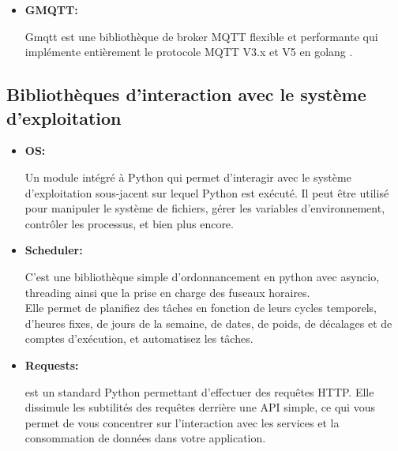 \begin{itemize}
\begin{figure}[!htb]
\begin{minipage}{0.60\textwidth}
                \end{minipage}
            \end{figure}
    \item \textbf{GMQTT: }
       
        \par Gmqtt est une bibliothèque de broker MQTT flexible et performante qui implémente entièrement le protocole MQTT V3.x et V5 en golang \cite{gmqtt}. 
       
   \end{itemize}
\subsection{Bibliothèques d'interaction avec le système d'exploitation}
\begin{itemize}
    \item \textbf{OS: }
        \par Un module intégré à Python qui permet d'interagir avec le système d'exploitation sous-jacent sur lequel Python est exécuté. 
        Il peut être utilisé pour manipuler le système de fichiers, gérer les variables d'environnement, contrôler les processus, et bien plus encore\cite{os}.

    \item \textbf{Scheduler: }
        \par C'est une bibliothèque simple d'ordonnancement en python avec asyncio, threading ainsi que la prise en charge des fuseaux horaires.\\
         Elle permet de planifiez des tâches en fonction de leurs cycles temporels, d'heures fixes, de jours de la semaine,
         de dates, de poids, de décalages et de comptes d'exécution, et automatisez les tâches\cite{scheduler}.
    \item \textbf{Requests: }
        \par est un standard Python permettant d'effectuer des requêtes HTTP.
         Elle dissimule les subtilités des requêtes derrière une API simple, ce qui vous permet de vous concentrer sur l'interaction avec les services et la consommation de données dans votre application\cite{requests}.
    
\end{itemize}
